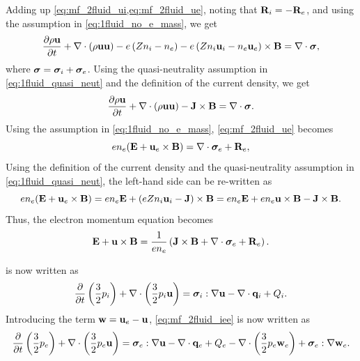 \documentclass[a4paper,11pt]{report}
\begin{document}
Adding up \cref{eq:mf_2fluid_ui,eq:mf_2fluid_ue}, noting that $\mathbf{R}_i = - \mathbf{R}_e$, and using the assumption in \cref{eq:1fluid_no_e_mass}, we get
\begin{equation*}
    \frac{\partial \rho \mathbf{u}}{\partial t} + \nabla \cdot \left( \rho \mathbf{u} \mathbf{u} \right) - e \left( Z n_i - n_e \right) - e \left( Z n_i \mathbf{u}_i - n_e \mathbf{u}_e \right) \times \mathbf{B} = \nabla \cdot \bm \sigma,
\end{equation*}
where $\bm \sigma = \bm \sigma_i + \bm \sigma_e$.
Using the quasi-neutrality assumption in \cref{eq:1fluid_quasi_neut} and the definition of the current density, we get
\begin{equation}
    \label{eq:sf_1ion_ui}
    \frac{\partial \rho \mathbf{u}}{\partial t} + \nabla \cdot \left( \rho \mathbf{u} \mathbf{u} \right) - \mathbf{J} \times \mathbf{B} = \nabla \cdot \bm \sigma.
\end{equation}
Using the assumption in \cref{eq:1fluid_no_e_mass}, \cref{eq:mf_2fluid_ue} becomes
\begin{equation*}
    e n_e ( \mathbf{E} + \mathbf{u}_e \times \mathbf{B} ) = \nabla \cdot \bm \sigma_e + \mathbf{R}_e,
\end{equation*}
Using the definition of the current density and the quasi-neutrality assumption in \cref{eq:1fluid_quasi_neut}, the left-hand side can be re-written as
\begin{equation*}
    e n_e ( \mathbf{E} + \mathbf{u}_e \times \mathbf{B} ) = e n_e \mathbf{E} + \left( e Z n_i \mathbf{u}_i - \mathbf{J} \right) \times \mathbf{B} = e n_e \mathbf{E} + e n_e \mathbf{u} \times \mathbf{B} - \mathbf{J} \times \mathbf{B}.
\end{equation*}
Thus, the electron momentum equation becomes
\begin{equation}
    \label{eq:sf_1ion_ue}
    \mathbf{E} + \mathbf{u} \times \mathbf{B} = \frac{1}{e n_e} \left( \mathbf{J} \times \mathbf{B} + \nabla \cdot \bm \sigma_e + \mathbf{R}_e \right).
\end{equation}

 is now written as
\begin{equation}
    \label{eq:sf_1ion_iei}
    \frac{\partial}{\partial t} \left( \frac{3}{2} p_i \right) + \nabla \cdot \left( \frac{3}{2} p_i \mathbf{u} \right) = \bm \sigma_i : \nabla \mathbf{u} - \nabla \cdot \mathbf{q}_i + Q_i.
\end{equation}
Introducing the term $\mathbf{w} = \mathbf{u}_e - \mathbf{u}$, \cref{eq:mf_2fluid_iee} is now written as
\begin{equation}
    \label{eq:sf_1ion_iee}
    \frac{\partial}{\partial t} \left( \frac{3}{2} p_e \right) + \nabla \cdot \left( \frac{3}{2} p_e \mathbf{u} \right) = \bm \sigma_e : \nabla \mathbf{u} - \nabla \cdot \mathbf{q}_e + Q_e - \nabla \cdot \left( \frac{3}{2} p_e \mathbf{w}_e \right) + \bm \sigma_e : \nabla \mathbf{w}_e.
\end{equation}
\end{document}
